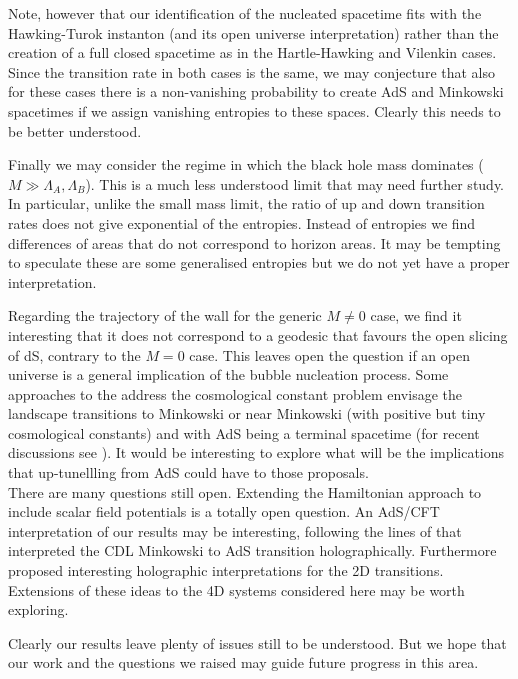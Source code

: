 \documentclass[a4paper,11pt]{article}
\numberwithin{equation}{section}
\numberwithin{equation}{section}
\begin{document}
Note, however that our identification of the nucleated spacetime fits with the Hawking-Turok instanton (and its open universe interpretation) rather than the creation of a full closed spacetime as in the Hartle-Hawking and Vilenkin cases. Since the transition rate in both cases is the same, we may conjecture that also for these cases there is a non-vanishing probability to create AdS and Minkowski spacetimes if we assign vanishing entropies to these spaces. Clearly this needs to be better understood.
\vskip 1mm 


Finally we may consider the regime in which the black hole mass dominates ($M\gg \Lambda_A, \Lambda_B$). This is a much less understood limit that may need further study. In particular, unlike the small mass limit, the ratio of up and down transition rates does not give exponential of the entropies. Instead of entropies we find differences of areas that do not correspond to horizon areas. It may be tempting to speculate these are some generalised entropies but we do not yet have a proper interpretation.
\vskip 1mm

Regarding the trajectory of the wall for the generic $M\neq 0$ case, we find it interesting that it does not correspond to a geodesic that favours the open slicing of dS, contrary to the $M=0$ case. This leaves open the question if an open universe is a general implication of the bubble nucleation process.
\vskip 1mm
Some approaches to the address the cosmological constant problem envisage the landscape transitions to Minkowski or near Minkowski (with positive but tiny cosmological constants) and with AdS being a terminal  spacetime  (for recent discussions see \cite{Giudice:2021viw,Kartvelishvili:2020thd,Friedrich:2022tqk}).  It would be interesting to explore what will be the implications that up-tunellling from AdS could have to those proposals.
\\
There are many questions still open. Extending the Hamiltonian approach to include scalar field potentials is a totally open question. An AdS/CFT interpretation of our results may be interesting, following the lines of  \cite{Maldacena:2010un} that interpreted the CDL Minkowski to AdS transition holographically. Furthermore \cite{Pasquarella:2022ibb} proposed interesting holographic interpretations for the 2D transitions. Extensions of these ideas to the 4D systems considered here may be worth exploring.
\vskip 1mm

Clearly our results leave  plenty of issues still to be understood. But we hope that our work and the questions we raised may guide future progress in this area.
\end{document}

